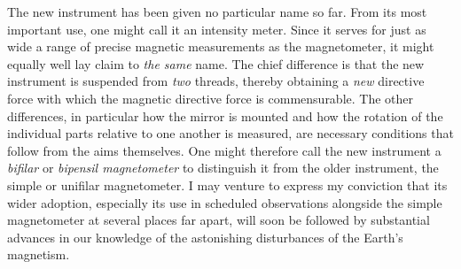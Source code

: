 The new instrument has been given no particular name so far. From its most important use, one might call it an intensity meter. Since it serves for just as wide a range of precise magnetic measurements as the magnetometer, it might equally well lay claim to \textit{the same} name. The chief difference is that the new instrument is suspended from \textit{two} threads, thereby obtaining a \textit{new} directive force with which the magnetic directive force is commensurable. The other differences, in particular how the mirror is mounted and how the rotation of the individual parts relative to one another is measured, are necessary conditions that follow from the aims themselves. One might therefore call the new instrument a \textit{bifilar} or \textit{bipensil magnetometer} to distinguish it from the older instrument, the simple or unifilar magnetometer. I may venture to express my conviction that its wider adoption, especially its use in scheduled observations alongside the simple magnetometer at several places far apart, will soon be followed by substantial advances in our knowledge of the astonishing disturbances of the Earth’s magnetism.

